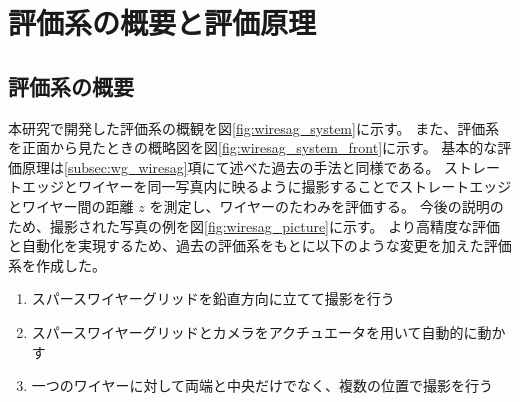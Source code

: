 \documentclass[../../main.tex]{subfiles}
\begin{document}
\section{評価系の概要と評価原理}
\subsection{評価系の概要}
本研究で開発した評価系の概観を図\ref{fig:wiresag_system}に示す。
また、評価系を正面から見たときの概略図を図\ref{fig:wiresag_system_front}に示す。
基本的な評価原理は\ref{subsec:wg_wiresag}項にて述べた過去の手法と同様である。
ストレートエッジとワイヤーを同一写真内に映るように撮影することでストレートエッジとワイヤー間の距離 $z$ を測定し、ワイヤーのたわみを評価する。
今後の説明のため、撮影された写真の例を図\ref{fig:wiresag_picture}に示す。
より高精度な評価と自動化を実現するため、過去の評価系をもとに以下のような変更を加えた評価系を作成した。
\begin{enumerate}
    \item スパースワイヤーグリッドを鉛直方向に立てて撮影を行う
    \item スパースワイヤーグリッドとカメラをアクチュエータを用いて自動的に動かす
    \item 一つのワイヤーに対して両端と中央だけでなく、複数の位置で撮影を行う
\end{enumerate}
\end{document}
